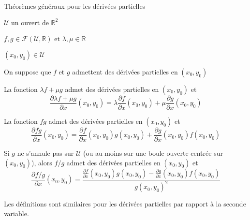     \begin{prop}{Théorèmes généraux pour les dérivées partielles}{}
        \begin{soient}
            \item $\mathcal{U}$ un ouvert de $\mathbb{R}^2$
            \item $f,g \in \mathcal{F}(\mathcal{U},\mathbb{R})$ et $\lambda,\mu \in \mathbb{R}$
            \item $(x_0,y_0) \in \mathcal{U}$
        \end{soient}
        On suppose que $f$ et $g$ admettent des dérivées partielles en $(x_0,y_0)$

        \begin{alors}
            \item La fonction $\lambda f + \mu g$ admet des dérivées partielles en $(x_0,y_0)$ et 
            \[ \frac{\partial \lambda f + \mu g}{\partial x}(x_0,y_0) = \lambda \frac{\partial f}{\partial x}(x_0,y_0) + \mu \frac{\partial g}{\partial x}(x_0,y_0) \] 
            \item La fonction $fg$ admet des dérivées partielles en $(x_0,y_0)$ et 
            \[ \frac{\partial fg}{\partial x}(x_0,y_0) = \frac{\partial f}{\partial x}(x_0,y_0)g(x_0,y_0) + \frac{\partial g}{\partial x}(x_0,y_0) f(x_0,y_0) \] 
            \item Si $g$ ne s’annule pas sur $\mathcal{U}$ (ou au moins sur une boule ouverte centrée sur $(x_0,y_0)$), alors $f / g$ admet des dérivées partielles en $(x_0,y_0)$ et 
            \[ \frac{\partial f/g}{\partial x}(x_0,y_0) = \frac{\frac{\partial f}{\partial x}(x_0,y_0)g(x_0,y_0) - \frac{\partial g}{\partial x}(x_0,y_0)f(x_0,y_0)}{g(x_0,y_0)^2} \]
        \end{alors}
        Les définitions sont similaires pour les dérivées partielles par rapport à la seconde variable.
    \end{prop}

